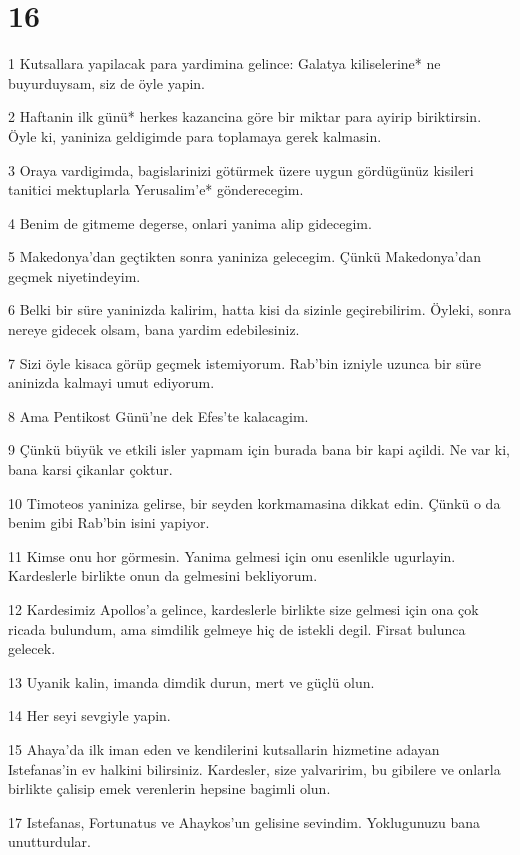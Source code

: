 \chapter{16}

\par 1 Kutsallara yapilacak para yardimina gelince: Galatya kiliselerine* ne buyurduysam, siz de öyle yapin.
\par 2 Haftanin ilk günü* herkes kazancina göre bir miktar para ayirip biriktirsin. Öyle ki, yaniniza geldigimde para toplamaya gerek kalmasin.
\par 3 Oraya vardigimda, bagislarinizi götürmek üzere uygun gördügünüz kisileri tanitici mektuplarla Yerusalim'e* gönderecegim.
\par 4 Benim de gitmeme degerse, onlari yanima alip gidecegim.
\par 5 Makedonya'dan geçtikten sonra yaniniza gelecegim. Çünkü Makedonya'dan geçmek niyetindeyim.
\par 6 Belki bir süre yaninizda kalirim, hatta kisi da sizinle geçirebilirim. Öyleki, sonra nereye gidecek olsam, bana yardim edebilesiniz.
\par 7 Sizi öyle kisaca görüp geçmek istemiyorum. Rab'bin izniyle uzunca bir süre aninizda kalmayi umut ediyorum.
\par 8 Ama Pentikost Günü'ne dek Efes'te kalacagim.
\par 9 Çünkü büyük ve etkili isler yapmam için burada bana bir kapi açildi. Ne var ki, bana karsi çikanlar çoktur.
\par 10 Timoteos yaniniza gelirse, bir seyden korkmamasina dikkat edin. Çünkü o da benim gibi Rab'bin isini yapiyor.
\par 11 Kimse onu hor görmesin. Yanima gelmesi için onu esenlikle ugurlayin. Kardeslerle birlikte onun da gelmesini bekliyorum.
\par 12 Kardesimiz Apollos'a gelince, kardeslerle birlikte size gelmesi için ona çok ricada bulundum, ama simdilik gelmeye hiç de istekli degil. Firsat bulunca gelecek.
\par 13 Uyanik kalin, imanda dimdik durun, mert ve güçlü olun.
\par 14 Her seyi sevgiyle yapin.
\par 15 Ahaya'da ilk iman eden ve kendilerini kutsallarin hizmetine adayan Istefanas'in ev halkini bilirsiniz. Kardesler, size yalvaririm, bu gibilere ve onlarla birlikte çalisip emek verenlerin hepsine bagimli olun.
\par 17 Istefanas, Fortunatus ve Ahaykos'un gelisine sevindim. Yoklugunuzu bana unutturdular.
